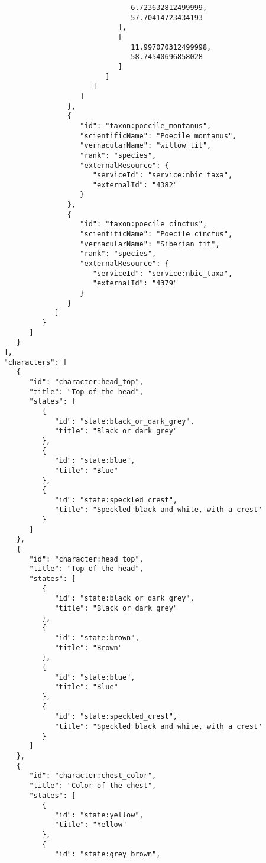 \documentclass[10pt,letterpaper]{article}
\begin{document}
\begin{verbatim}
                                 6.723632812499999,
                                 57.70414723434193
                              ],
                              [
                                 11.997070312499998,
                                 58.74540696858028
                              ]
                           ]
                        ]
                     ]
                  },
                  {
                     "id": "taxon:poecile_montanus",
                     "scientificName": "Poecile montanus",
                     "vernacularName": "willow tit",
                     "rank": "species",
                     "externalResource": {
                        "serviceId": "service:nbic_taxa",
                        "externalId": "4382"
                     }
                  },
                  {
                     "id": "taxon:poecile_cinctus",
                     "scientificName": "Poecile cinctus",
                     "vernacularName": "Siberian tit",
                     "rank": "species",
                     "externalResource": {
                        "serviceId": "service:nbic_taxa",
                        "externalId": "4379"
                     }
                  }
               ]
            }
         ]
      }
   ],
   "characters": [
      {
         "id": "character:head_top",
         "title": "Top of the head",
         "states": [
            {
               "id": "state:black_or_dark_grey",
               "title": "Black or dark grey"
            },
            {
               "id": "state:blue",
               "title": "Blue"
            },
            {
               "id": "state:speckled_crest",
               "title": "Speckled black and white, with a crest"
            }
         ]
      },
      {
         "id": "character:head_top",
         "title": "Top of the head",
         "states": [
            {
               "id": "state:black_or_dark_grey",
               "title": "Black or dark grey"
            },
            {
               "id": "state:brown",
               "title": "Brown"
            },
            {
               "id": "state:blue",
               "title": "Blue"
            },
            {
               "id": "state:speckled_crest",
               "title": "Speckled black and white, with a crest"
            }
         ]
      },
      {
         "id": "character:chest_color",
         "title": "Color of the chest",
         "states": [
            {
               "id": "state:yellow",
               "title": "Yellow"
            },
            {
               "id": "state:grey_brown",

\end{verbatim}
\end{document}
